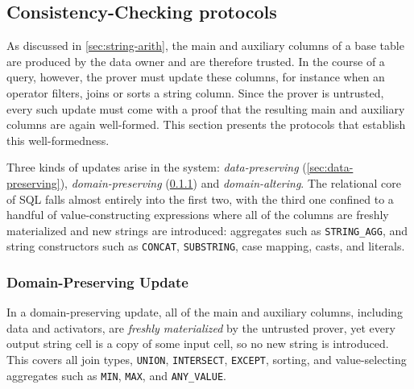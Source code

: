 \subsection{Consistency-Checking protocols}
\label{sec:consistency-checking}
As discussed in \cref{sec:string-arith}, the main and auxiliary columns of a base table are produced by the data owner and are therefore trusted. In the course of a query, however, the prover must update these columns, for instance when an operator filters, joins or sorts a string column. Since the prover is untrusted, every such update must come with a proof that the resulting main and auxiliary columns are again well-formed. This section presents the protocols that establish this well-formedness.

Three kinds of updates arise in the system: \emph{data-preserving} (\cref{sec:data-preserving}), \emph{domain-preserving} (\cref{sec:domain-preserving}) and \emph{domain-altering}. The relational core of SQL falls almost entirely into the first two, with the third one confined to a handful of value-constructing expressions where all of the columns are freshly materialized and new strings are introduced: aggregates such as \texttt{STRING\_AGG}, and string constructors such as \texttt{CONCAT}, \texttt{SUBSTRING}, case mapping, casts, and literals.

\subsubsection{Domain-Preserving Update}
\label{sec:domain-preserving}

In a domain-preserving update, all of the main and auxiliary columns, including data and activators, are \emph{freshly materialized} by the untrusted prover, yet every output string cell is a copy of some input cell, so no new string is introduced. This covers all join types, \texttt{UNION}, \texttt{INTERSECT}, \texttt{EXCEPT}, sorting, and value-selecting aggregates such as \texttt{MIN}, \texttt{MAX}, and \texttt{ANY\_VALUE}.


